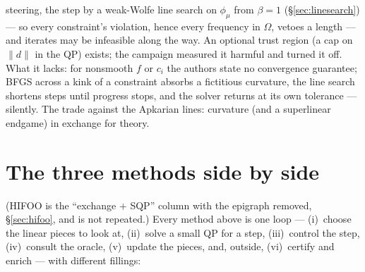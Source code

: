\documentclass[11pt,a4paper]{article}
\newcommand{\revc}[1]{#1}
\begin{document}
steering, the step by a weak-Wolfe line search on $\phi_\mu$ from $\beta=1$
(\S\ref{sec:linesearch}) --- so every constraint's violation, hence every frequency in
$\Omega$, vetoes a length --- and iterates may be infeasible along the way.  An optional
trust region (a cap on $\|d\|$ in the QP) exists; the campaign measured it harmful and
turned it off.  What it lacks: for nonsmooth $f$ or $c_i$ the authors state no
convergence guarantee; BFGS across a kink of a constraint absorbs a fictitious curvature,
the line search shortens steps until progress stops, and the solver returns at its own
tolerance --- silently.  The trade against the Apkarian lines: curvature (and a
superlinear endgame) in exchange for theory.

\section{The three methods side by side}
\label{sec:compare}

\revc{(HIFOO is the ``exchange $+$ SQP'' column with the epigraph removed,
\S\ref{sec:hifoo}, and is not repeated.)}  Every method above is one loop --- (i)~choose the linear pieces to look at, (ii)~solve a
small QP for a step, (iii)~control the step, (iv)~consult the oracle, (v)~update the
pieces, and, outside, (vi)~certify and enrich --- with different fillings:
\end{document}
